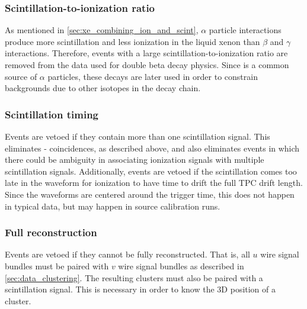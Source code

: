 \documentclass[herrin-thesis.tex]{subfiles}
\begin{document}
\subsubsection{Scintillation-to-ionization ratio}
As mentioned in \cref{sec:xe_combining_ion_and_scint}, \(\alpha\) particle interactions produce more scintillation and less ionization in the liquid xenon than \(\beta\) and \(\gamma\) interactions. Therefore, events with a large scintillation-to-ionization ratio are removed from the data used for double beta decay physics. Since  is a common source of \(\alpha\) particles, these decays are later used in order to constrain backgrounds due to other isotopes in the  decay chain.

\subsubsection{Scintillation timing}
Events are vetoed if they contain more than one scintillation signal. This eliminates - coincidences, as described above, and also eliminates events in which there could be ambiguity in associating ionization signals with multiple scintillation signals. Additionally, events are vetoed if the scintillation comes too late in the waveform for ionization to have time to drift the full TPC drift length. Since the waveforms are centered around the trigger time, this does not happen in typical data, but may happen in source calibration runs.

\subsubsection{Full reconstruction}
Events are vetoed if they cannot be fully reconstructed. That is, all \(u\) wire signal bundles must be paired with \(v\) wire signal bundles as described in \cref{sec:data_clustering}. The resulting clusters must also be paired with a scintillation signal. This is necessary in order to know the 3D position of a cluster.
\end{document}
